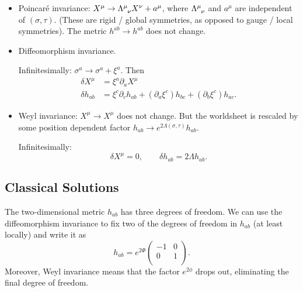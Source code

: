 \begin{itemize}
  \item Poincaré invariance: $X^{\mu} \to \Lambda\indices{^{\mu}_{\nu}} X^{\nu} + a^{\mu}$, where $\Lambda\indices{^{\mu}_{\nu}}$ and $a^{\mu}$ are independent of $(\sigma, \tau)$. (These are rigid / global symmetries, as opposed to gauge / local symmetries). The metric $h^{ab} \to h^{ab}$ does not change.
  \item Diffeomorphism invariance.

    Infinitesimally: $\sigma^{a} \to \sigma^{a} + \xi^{a}$. Then
    \begin{align}
      \delta X^{\mu} &= \xi^{a} \partial_{a} X^{\mu} \\
      \delta h_{ab} &= \xi^{c} \partial_{c} h_{ab} + (\partial_{a} \xi^{c}) h_{bc} + (\partial_{b} \xi^{c}) h_{ac}.
    \end{align}
  \item Weyl invariance: $X^{\mu} \to X^{\mu}$ does not change. But the worldsheet is rescaled by some position dependent factor $h_{ab} \to e^{2 \Lambda(\sigma, \tau)} h_{ab}$.

    Infinitesimally:
    \begin{equation}
      \delta X^{\mu} = 0, \qquad \delta h_{ab} = 2 \Lambda h_{ab}.
    \end{equation}
\end{itemize}

\subsection{Classical Solutions}%
\label{sub:classical_solutions}

The two-dimensional metric $h_{ab}$ has three degrees of freedom. We can use the diffeomorphism invariance to fix two of the degrees of freedom in $h_{ab}$ (at least locally) and write it as
\begin{equation}
  h_{ab} = e^{2 \Phi}
  \begin{pmatrix}
   -1 & 0 \\
   0 & 1 \\
  \end{pmatrix}.
\end{equation}
Moreover, Weyl invariance means that the factor $e^{2 \phi}$ drops out, eliminating the final degree of freedom.

